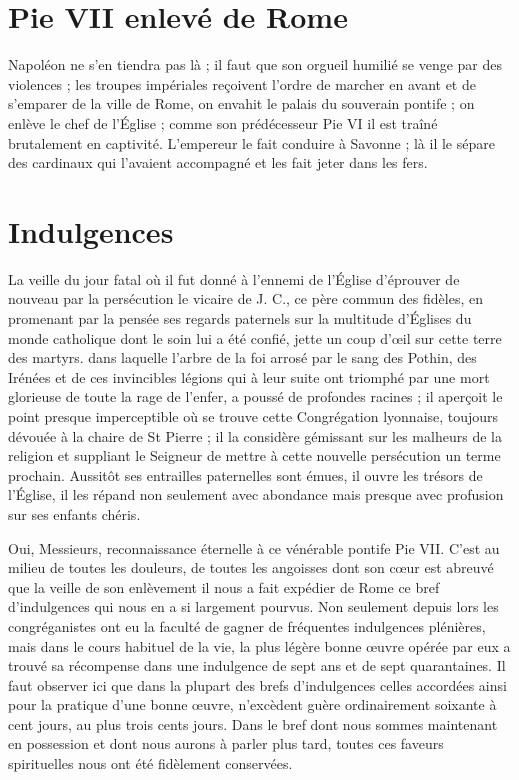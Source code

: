 \section*{Pie VII enlevé de Rome}
Napoléon ne s'en tiendra pas là ; il faut que son orgueil humilié se venge par des violences ; les troupes impériales reçoivent l'ordre de marcher en avant et de s'emparer de la ville de Rome, on envahit le palais du souverain pontife ; on enlève le chef de l'Église ; comme son prédécesseur Pie VI il est traîné brutalement en captivité. L'empereur le fait conduire à Savonne ; là il le sépare des cardinaux qui l'avaient accompagné et les fait jeter dans les fers.

\section*{Indulgences}
La veille du jour fatal où il fut donné à l'ennemi de l'Église d'éprouver de nouveau par la persécution le vicaire de J. C., ce père commun des fidèles, en promenant par la pensée ses regards paternels sur la multitude d'Églises du monde catholique dont le soin lui a été confié, jette un coup d'œil sur cette terre des martyrs.
dans laquelle l'arbre de la foi arrosé par le sang des Pothin, des Irénées et de ces invincibles légions qui à leur suite ont triomphé par une mort glorieuse de toute la rage de l'enfer, a poussé de profondes racines ; il aperçoit le point presque imperceptible où se trouve cette Congrégation lyonnaise, toujours dévouée à la chaire de St Pierre ; il la considère gémissant sur les malheurs de la religion et suppliant le Seigneur de mettre à cette nouvelle persécution un terme prochain. Aussitôt ses entrailles paternelles sont émues, il ouvre les trésors de l'Église, il les répand non seulement avec abondance mais presque avec profusion sur ses enfants chéris.

Oui, Messieurs, reconnaissance éternelle à ce vénérable pontife Pie VII. C'est au milieu de toutes les douleurs, de toutes les angoisses dont son cœur est abreuvé que la veille de son enlèvement il nous a fait expédier de Rome ce bref d'indulgences qui nous en a si largement pourvus. Non seulement depuis lors les congréganistes ont eu la faculté de gagner de fréquentes indulgences plénières, mais dans le cours habituel de la vie, la plus légère bonne œuvre opérée par eux a trouvé sa récompense dans une indulgence de sept ans et de sept quarantaines. Il faut observer ici que dans la plupart des brefs d'indulgences celles accordées ainsi pour la pratique d'une bonne œuvre, n'excèdent guère ordinairement soixante à cent jours, au plus trois cents jours. Dans le bref dont nous sommes maintenant en possession et dont nous aurons à parler plus tard, toutes ces faveurs spirituelles nous ont été fidèlement conservées.


